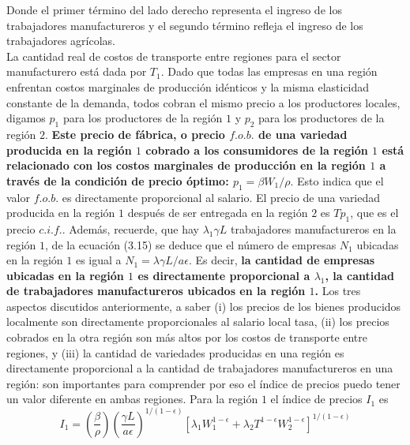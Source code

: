 Donde el primer término del lado derecho representa el ingreso de los trabajadores manufactureros y el segundo término refleja el ingreso de los trabajadores agrícolas.\\
La cantidad real de costos de transporte entre regiones para el sector manufacturero está dada por $T_1$. Dado que todas las empresas en una región enfrentan costos marginales de producción idénticos y la misma elasticidad constante de la demanda, todos cobran el mismo precio a los productores locales, digamos $p_1$ para los productores de la región $1$ y $p_2$ para los productores de la región $2$. \textbf{\boldmath Este precio de fábrica, o precio $f.o.b.$ de una variedad producida en la región $1$ cobrado a los consumidores de la región $1$ está relacionado con los costos marginales de producción en la región $1$ a través de la condición de precio óptimo: $p_1 = \beta W_1/\rho.$} Esto indica que el valor $f.o.b.$ es directamente proporcional al salario. El precio de una variedad producida en la región $1$ después de ser entregada en la región $2$ es $Tp_1$, que es el precio $c.i.f.$. Además, recuerde,  que hay $\lambda_1 \gamma L$ trabajadores manufactureros en la región $1$, de la ecuación (3.15) se deduce que el número de empresas $N_1$ ubicadas en la región $1$ es igual a $N_1 = \lambda \gamma L/a\epsilon$. Es decir, \textbf{la cantidad de empresas ubicadas en la región $1$ es directamente proporcional a $\lambda_1$, la cantidad de trabajadores manufactureros ubicados en la región $1$.} Los tres aspectos discutidos anteriormente, a saber (i) los precios de los bienes producidos localmente son directamente proporcionales al salario local tasa, (ii) los precios cobrados en la otra región son más altos por los costos de transporte entre regiones, y (iii) la cantidad de variedades producidas en una región es directamente proporcional a la cantidad de trabajadores manufactureros en una región: son importantes para comprender por eso el índice de precios puedo tener un valor diferente en ambas regiones. Para la región $1$ el índice de precios $I_1$ es 
\begin{equation}
    I_1 = \left(\dfrac{\beta}{\rho}\right) \left(\dfrac{\gamma L}{a\epsilon}\right)^{1/(1-\epsilon)} \left[\lambda_1 W_1^{1-\epsilon} + \lambda_2 T^{1-\epsilon} W_2^{1-\epsilon}\right]^{1/(1-\epsilon)}
\end{equation}

